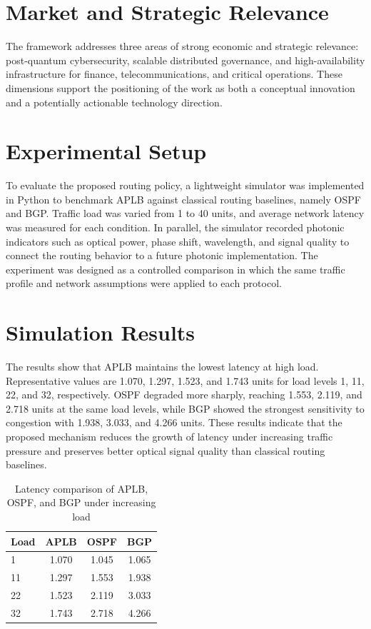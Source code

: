 \documentclass[smallextended]{svjour3}
\begin{document}
\section{Market and Strategic Relevance}
The framework addresses three areas of strong economic and strategic relevance: post-quantum cybersecurity, scalable distributed governance, and high-availability infrastructure for finance, telecommunications, and critical operations. These dimensions support the positioning of the work as both a conceptual innovation and a potentially actionable technology direction.

\section{Experimental Setup}
To evaluate the proposed routing policy, a lightweight simulator was implemented in Python to benchmark APLB against classical routing baselines, namely OSPF and BGP. Traffic load was varied from 1 to 40 units, and average network latency was measured for each condition. In parallel, the simulator recorded photonic indicators such as optical power, phase shift, wavelength, and signal quality to connect the routing behavior to a future photonic implementation. The experiment was designed as a controlled comparison in which the same traffic profile and network assumptions were applied to each protocol.

\section{Simulation Results}
The results show that APLB maintains the lowest latency at high load. Representative values are 1.070, 1.297, 1.523, and 1.743 units for load levels 1, 11, 22, and 32, respectively. OSPF degraded more sharply, reaching 1.553, 2.119, and 2.718 units at the same load levels, while BGP showed the strongest sensitivity to congestion with 1.938, 3.033, and 4.266 units. These results indicate that the proposed mechanism reduces the growth of latency under increasing traffic pressure and preserves better optical signal quality than classical routing baselines.

\begin{table}[t]
\centering
\caption{Latency comparison of APLB, OSPF, and BGP under increasing load}
\begin{tabular}{lccc}
\hline
Load & APLB & OSPF & BGP \\
\hline
1 & 1.070 & 1.045 & 1.065 \\
11 & 1.297 & 1.553 & 1.938 \\
22 & 1.523 & 2.119 & 3.033 \\
32 & 1.743 & 2.718 & 4.266 \\
\hline
\end{tabular}
\end{table}
\end{document}
